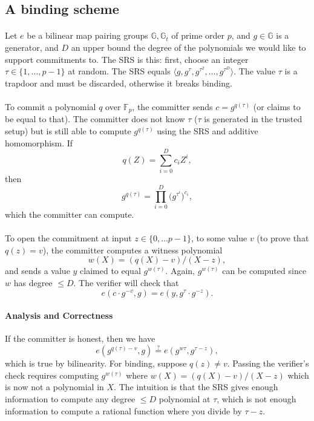 \documentclass[11pt]{article}
\newcommand{\group}{\mathbb{G}}
\begin{document}
\subsection{A binding scheme} 
\paragraph{} Let $e$ be a bilinear map pairing groups $\group, \group_t$ of prime order $p$, and $g \in \group$ is a generator, and $D$ an upper bound the degree of the polynomials we would like to support commitments to. The SRS is this: first, choose an integer $\tau \in \{1, \ldots, p-1\}$ at random. The SRS equals $\langle g, g^\tau, g^{\tau^2}, \ldots, g^{\tau^D} \rangle$. The value $\tau$ is a trapdoor and must be discarded, otherwise it breaks binding.

\paragraph{} To commit a polynomial $q$ over $\mathbb{F}_p$, the committer sends $c = g^{q(\tau)}$ (or claims to be equal to that). The committer does not know $\tau$ ($\tau$ is generated in the trusted setup) but is still able to compute $g^{q(\tau)}$ using the SRS and additive homomorphism. If
\[ q(Z) = \sum_{i = 0}^D c_i Z^i, \]
then
\[ g^{q(\tau)} = \prod_{i = 0}^D \Big( g^{\tau^i} \Big)^{c_i}, \]
which the committer can compute.

\paragraph{} To open the commitment at input $z \in \{0, \ldots p - 1\}$, to some value $v$ (to prove that $q(z) = v$), the committer computes a witness polynomial
\[ w(X) = (q(X) - v)/(X - z), \]
and sends a value $y$ claimed to equal $g^{w(\tau)}$. Again, $g^{w(\tau)}$ can be computed since $w$ has degree $\leq D$. The verifier will check that
\[ e(c \cdot g^{-v}, g) = e(y, g^\tau \cdot g^{-z}). \]

\paragraph{Analysis and Correctness} If the committer is honest, then we have
\[ e(g^{q(\tau) - v}, g) \overset{?}{=} e(g^{w\tau}, g^{\tau - z}), \]
which is true by bilinearity. For binding, suppose $q(z) \neq v$. Passing the verifier's check requires computing $g^{w(\tau)}$ where $w(X) = (q(X) - v) / (X - z)$ which is now not a polynomial in $X$. The intuition is that the SRS gives enough information to compute any degree $\leq D$ polynomial at $\tau$, which is not enough information to compute a rational function where you divide by $\tau - z$.
\end{document}
